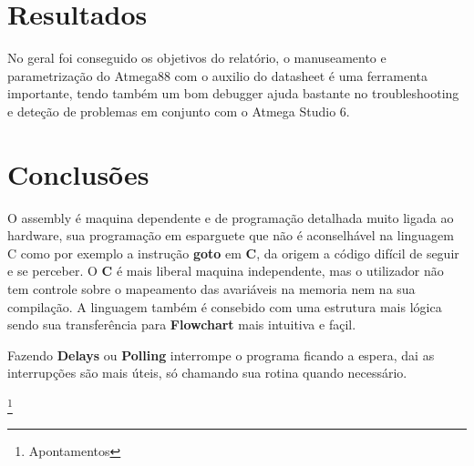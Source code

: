 \documentclass[titlepage, a4paper, 10pt, reqno, openany]{report}
\begin{document}
	\section{Resultados}
	No geral foi conseguido os objetivos do relat\'{o}rio, o manuseamento e parametriza\c{c}\~{a}o do Atmega88 com o auxilio do datasheet \'{e} uma ferramenta importante, tendo tamb\'{e}m um bom debugger ajuda bastante no troubleshooting e dete\c{c}\~{a}o de problemas em conjunto com o Atmega Studio 6. 	

	\section{Conclus\~{o}es}
	O assembly \'{e} maquina dependente e de programa\c{c}\~{a}o detalhada muito ligada ao hardware, sua programa\c{c}\~{a}o em esparguete que n\~{a}o \'{e} aconselh\'{a}vel na linguagem C como por exemplo a instru\c{c}\~{a}o {\bf goto} em {\bf C}, da origem a c\'{o}digo dif\'{i}cil de seguir e se perceber.
	O {\bf C} \'{e} mais liberal maquina independente, mas o utilizador n\~{a}o tem controle sobre o mapeamento das avari\'{a}veis na memoria nem na sua compila\c{c}\~{a}o. A linguagem tamb\'{e}m \'{e} consebido com uma estrutura mais l\'{o}gica sendo sua transfer\^{e}ncia para {\bf Flowchart} mais intuitiva e fa\c{c}il. \par
	Fazendo {\bf Delays} ou {\bf Polling} interrompe o programa ficando a espera, dai as interrup\c{c}\~{o}es s\~{a}o mais \'{u}teis, s\'{o} chamando sua rotina quando necess\'{a}rio.
	
\newpage

%
\cite{*}

%
%
\newpage
\footnote{Apontamentos}
%
	
\end{document}
